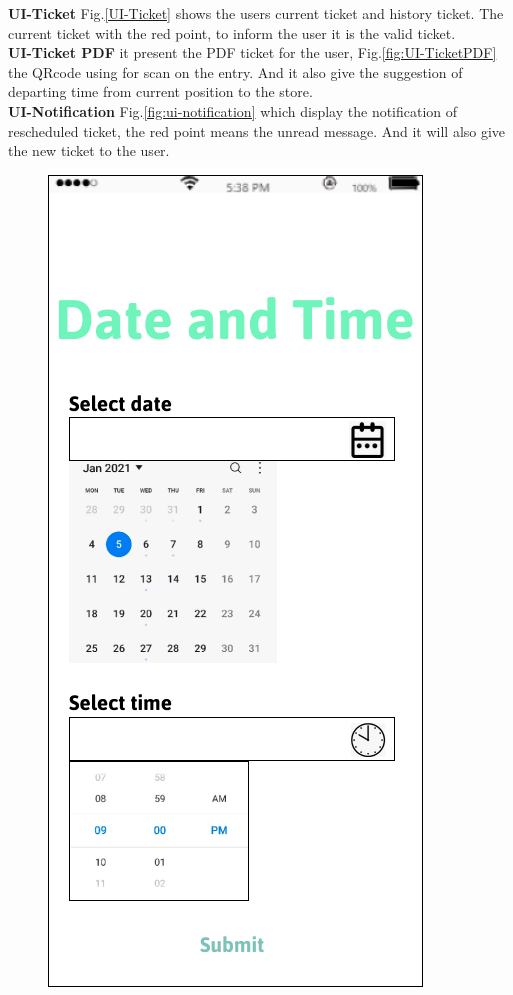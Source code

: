 \documentclass[a4paper,12pt]{report}
\begin{document}
\textbf{UI-Ticket}  Fig.\ref{UI-Ticket} shows the users current ticket and history ticket. The current ticket with the red point, to inform the user it is the valid ticket.~\\

\textbf{UI-Ticket PDF} it present the PDF ticket for the user, Fig.\ref{fig:UI-TicketPDF} the QRcode using for scan on the entry. And it also give the suggestion of departing time from current position to the store.~\\
 
\textbf{UI-Notification}  Fig.\ref{fig:ui-notification} which display the notification of rescheduled ticket, the red point means the unread message. And it will also give the new ticket to the user.



\begin{figure}[H]
	\begin{minipage}[t]{0.56\linewidth}
		\centering
		\includegraphics[scale=0.5]{UI-DateTime}

\end{minipage}
\end{figure}
\end{document}
